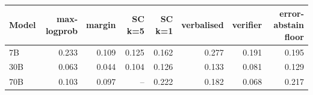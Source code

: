 \begin{tabular}{lrrrrrrr}
\toprule
Model & max-logprob & margin & SC k=5 & SC k=1 & verbalised & verifier & error-abstain floor \\
\midrule
7B & 0.233 & 0.109 & 0.125 & 0.162 & 0.277 & 0.191 & 0.195 \\
30B & 0.063 & 0.044 & 0.104 & 0.126 & 0.133 & 0.081 & 0.129 \\
70B & 0.103 & 0.097 & -- & 0.222 & 0.182 & 0.068 & 0.217 \\
\bottomrule
\end{tabular}
